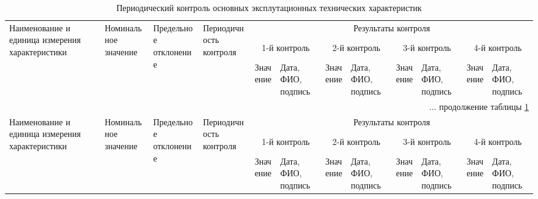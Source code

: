 \begin{landscape}

		\begin{small}		
		\begin{longtable}{|p{3cm}|p{2cm}|p{2cm}|p{1.8cm}|p{1.4cm}|p{1.6cm}|p{1.4cm}|p{1.6cm}|p{1.4cm}|p{1.6cm}|p{1.4cm}|p{1.6cm}|}
			\caption{\label{tab:tech_control} Периодический контроль основных эксплутационных технических характеристик}\\ 
			
			\hline
			\multirow{3}{3cm}{Наименование и единица измерения характеристики} & \multirow{2}{2cm}{Номиналь\-ное значение} & \multirow{3}{2cm}{Предельное отклонение} & \multirow{3}{1.8cm}{Перио\-дичность контроля} & \multicolumn{8}{|c|}{Результаты контроля} \\ \cline{5-12} 
			& & & & \multicolumn{2}{|c|}{1-й контроль} & \multicolumn{2}{|c|}{2-й контроль} & \multicolumn{2}{|c|}{3-й контроль} & \multicolumn{2}{|c|}{4-й контроль} \\ \cline{5-12} 
      &  &  &  & Зна\-чение & Дата, ФИО, подпись & Зна\-чение & Дата, ФИО, подпись & Зна\-чение & Дата, ФИО, подпись & Зна\-чение & Дата, ФИО, подпись \\ \hline
    
		\endfirsthead

		\multicolumn{12}{r}{... продолжение таблицы \ref{tab:tech_control}}\\ %
					\hline
			\multirow{3}{3cm}{Наименование и единица измерения характеристики} & \multirow{2}{2cm}{Номиналь\-ное значение} & \multirow{3}{2cm}{Предельное отклонение} & \multirow{3}{1.8cm}{Перио\-дичность контроля} & \multicolumn{8}{|c|}{Результаты контроля} \\ \cline{5-12} 
			& & & & \multicolumn{2}{|c|}{1-й контроль} & \multicolumn{2}{|c|}{2-й контроль} & \multicolumn{2}{|c|}{3-й контроль} & \multicolumn{2}{|c|}{4-й контроль} \\ \cline{5-12} 
      &  &  &  & Зна\-чение & Дата, ФИО, подпись & Зна\-чение & Дата, ФИО, подпись & Зна\-чение & Дата, ФИО, подпись & Зна\-чение & Дата, ФИО, подпись \\ \hline
		\endhead    
 			

\end{longtable}
\end{small}
\end{landscape}
